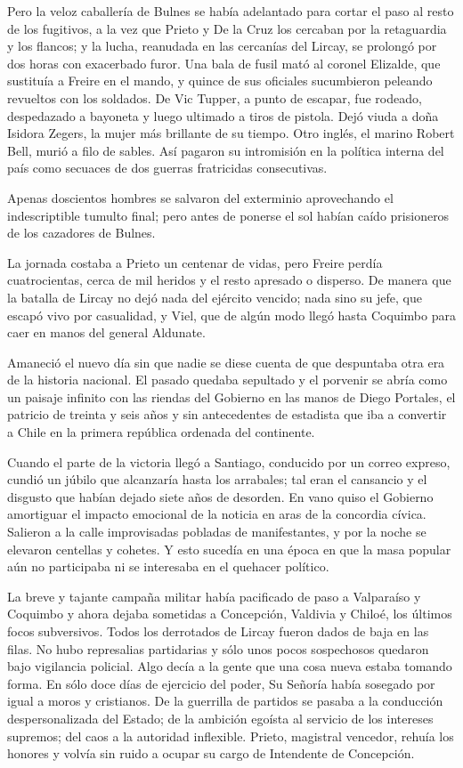 \documentclass[10pt,twoside,openright]{memoir}
\begin{document}
Pero la veloz caballería de Bulnes se había adelantado para cortar el
paso al resto de los fugitivos, a la
vez que Prieto y De la Cruz los cercaban por la retaguardia y los
flancos; y la lucha, reanudada en las cercanías del Lircay, se prolongó
por dos horas con exacerbado furor. Una bala de fusil mató al coronel
Elizalde, que sustituía a Freire en el mando, y quince de sus oficiales
sucumbieron peleando revueltos con los soldados. De Vic Tupper, a punto
de escapar, fue rodeado, despedazado a bayoneta y luego ultimado a tiros
de pistola. Dejó viuda a doña Isidora Zegers, la mujer más brillante de
su tiempo. Otro inglés, el marino Robert Bell, murió a filo de sables.
Así pagaron su intromisión en la política interna del país como secuaces
de dos guerras fratricidas consecutivas.


Apenas doscientos hombres se salvaron
del exterminio aprovechando el indescriptible tumulto final; pero antes
de ponerse el sol habían caído prisioneros de los cazadores de Bulnes.

La jornada costaba a Prieto un centenar de vidas, pero Freire perdía
cuatrocientas, cerca de mil heridos y el resto apresado o disperso. De
manera que la batalla de Lircay no dejó nada del ejército vencido; nada
sino su jefe, que escapó vivo por casualidad, y Viel, que de algún modo
llegó hasta Coquimbo para caer en manos del general Aldunate.

Amaneció el nuevo día sin que nadie
se diese cuenta de que despuntaba otra era de la historia nacional. El
pasado quedaba sepultado y el porvenir se abría como un paisaje infinito
con las riendas del Gobierno en las manos de Diego Portales, el patricio
de treinta y seis años y sin antecedentes de estadista que iba a
convertir a Chile en la primera república ordenada del continente.

Cuando el parte de la victoria llegó a Santiago, conducido por un correo
expreso, cundió un júbilo que alcanzaría hasta los arrabales; tal eran
el cansancio y el disgusto que habían dejado siete años de desorden. En
vano quiso el Gobierno amortiguar el impacto emocional de la noticia en
aras de la concordia cívica. Salieron a la calle improvisadas pobladas
de manifestantes, y por la noche se elevaron centellas y cohetes. Y esto
sucedía en una época en que la masa popular aún no participaba ni se
interesaba en el quehacer político.

La breve y tajante campaña militar había pacificado de paso a Valparaíso
y Coquimbo y ahora dejaba sometidas a Concepción, Valdivia y Chiloé, los
últimos focos subversivos. Todos los derrotados de Lircay fueron dados
de baja en las filas. No hubo represalias partidarias y sólo unos pocos
sospechosos quedaron bajo vigilancia policial. Algo decía a la gente que
una cosa nueva estaba tomando forma. En sólo doce días de ejercicio del
poder, Su Señoría había sosegado por igual a moros y cristianos. De la
guerrilla de partidos se pasaba a la conducción despersonalizada del
Estado; de la ambición egoísta al servicio de los intereses supremos;
del caos a la autoridad inflexible. Prieto, magistral vencedor, rehuía
los honores y volvía sin ruido a ocupar su cargo de Intendente de
Concepción.
\end{document}
